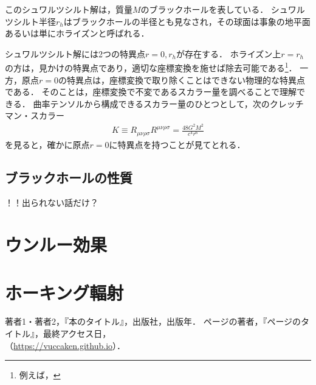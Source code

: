\documentclass[uplatex,dvipdfmx]{vkaishi}
\begin{document}
このシュワルツシルト解は，質量$M$のブラックホールを表している．
シュワルツシルト半径$r_h$はブラックホールの半径とも見なされ，その球面は事象の地平面あるいは単にホライズンと呼ばれる．

シュワルツシルト解には2つの特異点$r = 0, r_h$が存在する．
ホライズン上$r = r_h$の方は，見かけの特異点であり，適切な座標変換を施せば除去可能である\footnote{例えば，}．
一方，原点$r = 0$の特異点は，座標変換で取り除くことはできない物理的な特異点である．
そのことは，座標変換で不変であるスカラー量を調べることで理解できる．
曲率テンソルから構成できるスカラー量のひとつとして，次のクレッチマン・スカラー
\begin{align}
  K \equiv R_{\mu\nu\rho\sigma} R^{\mu\nu\rho\sigma} = \frac{48 G^2 M^2}{c^4 r^6}
\end{align}
を見ると，確かに原点$r = 0$に特異点を持つことが見てとれる．


\subsection{ブラックホールの性質}

！！出られない話だけ？






\section{ウンルー効果}



\section{ホーキング輻射}




\begin{thebibliography}{99}
   著者1・著者2，『本のタイトル』，出版社，出版年．
   ページの著者，『ページのタイトル』，最終アクセス日，\\（\url{https://vuccaken.github.io}）．
\end{thebibliography}
\end{document}
